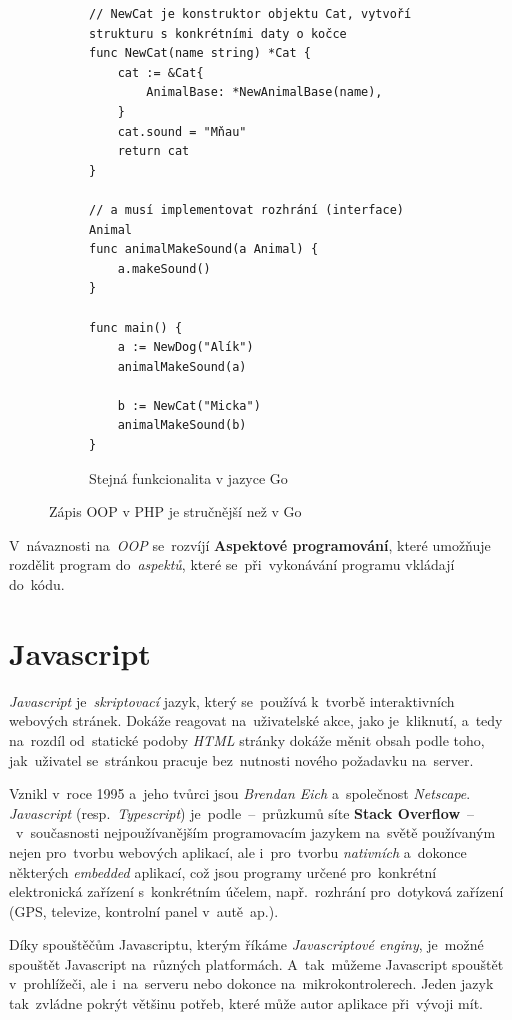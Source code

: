 \documentclass[11pt,a4paper]{report}
\begin{document}
\begin{figure}
\begin{subfigure}[b]{0.45\linewidth}
\begin{verbatim}
// NewCat je konstruktor objektu Cat, vytvoří strukturu s konkrétními daty o kočce
func NewCat(name string) *Cat {
	cat := &Cat{
		AnimalBase: *NewAnimalBase(name),
	}
	cat.sound = "Mňau"
	return cat
}

// a musí implementovat rozhrání (interface) Animal
func animalMakeSound(a Animal) {
    a.makeSound()
}

func main() {
	a := NewDog("Alík")
	animalMakeSound(a)

	b := NewCat("Micka")
	animalMakeSound(b)
}
                    \end{verbatim}
                    \caption{Stejná funkcionalita v jazyce Go}
                \end{subfigure}
                \caption{Zápis OOP v PHP je stručnější než v Go}
                \label{oop:difference}
            \end{figure}

            V~návaznosti na~\emph{OOP} se~rozvíjí \textbf{Aspektové programování}, které umožňuje rozdělit program do~\emph{aspektů}, které se~při~vykonávání programu vkládají do~kódu. \cite{macurova2012:aspektove}

        \section{Javascript}
            \emph{Javascript} je~\emph{skriptovací} jazyk, který se~používá k~tvorbě interaktivních webových stránek. Dokáže reagovat na~uživatelské akce, jako je~kliknutí, a~tedy na~rozdíl od~statické podoby \emph{HTML} stránky dokáže měnit obsah podle toho, jak~uživatel se~stránkou pracuje bez~nutnosti nového požadavku na~server.

            Vznikl v~roce 1995 a~jeho tvůrci jsou \emph{Brendan Eich} a~společnost \emph{Netscape}. \emph{Javascript} (resp.~\emph{Typescript}) je~podle~--~průzkumů síte \textbf{Stack Overflow}~--~v~současnosti nejpoužívanějším programovacím jazykem na~světě používaným nejen pro~tvorbu webových aplikací, ale i~pro~tvorbu \emph{nativních} a~dokonce některých \emph{embedded} aplikací, což jsou programy určené pro~konkrétní elektronická zařízení s~konkrétním účelem, např.~rozhrání pro~dotyková zařízení (GPS, televize, kontrolní panel v~autě~ap.).

            Díky spouštěčům Javascriptu, kterým říkáme \emph{Javascriptové enginy}, je~možné spouštět Javascript na~různých platformách. A~tak~můžeme Javascript spouštět v~prohlížeči, ale i~na~serveru nebo dokonce na~mikrokontrolerech. Jeden jazyk tak~zvládne pokrýt většinu potřeb, které může autor aplikace při~vývoji mít.
\end{document}
